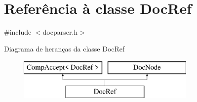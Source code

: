 \hypertarget{class_doc_ref}{\section{Referência à classe Doc\-Ref}
\label{class_doc_ref}
}


{\ttfamily \#include $<$docparser.\-h$>$}

Diagrama de heranças da classe Doc\-Ref\begin{figure}[H]
\begin{center}
\leavevmode
\includegraphics[height=2.000000cm]{class_doc_ref}
\end{center}
\end{figure}
